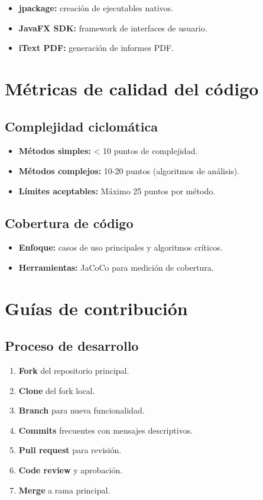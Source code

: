 \begin{itemize}
    \item \textbf{jpackage:} creación de ejecutables nativos.
    \item \textbf{JavaFX SDK:} framework de interfaces de usuario.
    \item \textbf{iText PDF:} generación de informes PDF.
\end{itemize}

\section{Métricas de calidad del código}

\subsection{Complejidad ciclomática}

\begin{itemize}
    \item \textbf{Métodos simples:} < 10 puntos de complejidad.
    \item \textbf{Métodos complejos:} 10-20 puntos (algoritmos de análisis).
    \item \textbf{Límites aceptables:} Máximo 25 puntos por método.
\end{itemize}

\subsection{Cobertura de código}

\begin{itemize}
    \item \textbf{Enfoque:} casos de uso principales y algoritmos críticos.
    \item \textbf{Herramientas:} JaCoCo para medición de cobertura.
\end{itemize}

\section{Guías de contribución}

\subsection{Proceso de desarrollo}

\begin{enumerate}
    \item \textbf{Fork} del repositorio principal.
    \item \textbf{Clone} del fork local.
    \item \textbf{Branch} para nueva funcionalidad.
    \item \textbf{Commits} frecuentes con mensajes descriptivos.
    \item \textbf{Pull request} para revisión.
    \item \textbf{Code review} y aprobación.
    \item \textbf{Merge} a rama principal.
\end{enumerate}

